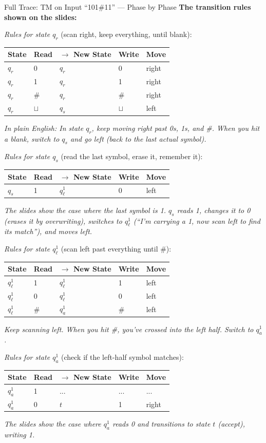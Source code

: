 \documentclass[11pt,a4paper]{article}
\begin{document}
\begin{examplebox}{Full Trace: TM on Input ``101\#11'' --- Phase by Phase}
\textbf{The transition rules shown on the slides:}

\textit{Rules for state $q_r$} (scan right, keep everything, until blank):
\begin{center}
\begin{tabular}{lllll}
\toprule
State & Read & $\to$ New State & Write & Move \\
\midrule
$q_r$ & 0 & $q_r$ & 0 & right \\
$q_r$ & 1 & $q_r$ & 1 & right \\
$q_r$ & \# & $q_r$ & \# & right \\
$q_r$ & $\sqcup$ & $q_s$ & $\sqcup$ & left \\
\bottomrule
\end{tabular}
\end{center}
\textit{In plain English: In state $q_r$, keep moving right past 0s, 1s, and \#. When you hit a blank, switch to $q_s$ and go left (back to the last actual symbol).}

\textit{Rules for state $q_s$} (read the last symbol, erase it, remember it):
\begin{center}
\begin{tabular}{lllll}
\toprule
State & Read & $\to$ New State & Write & Move \\
\midrule
$q_s$ & 1 & $q_\ell^1$ & 0 & left \\
\bottomrule
\end{tabular}
\end{center}
\textit{The slides show the case where the last symbol is 1. $q_s$ reads 1, changes it to 0 (erases it by overwriting), switches to $q_\ell^1$ (``I'm carrying a 1, now scan left to find its match''), and moves left.}

\textit{Rules for state $q_\ell^1$} (scan left past everything until \#):
\begin{center}
\begin{tabular}{lllll}
\toprule
State & Read & $\to$ New State & Write & Move \\
\midrule
$q_\ell^1$ & 1 & $q_\ell^1$ & 1 & left \\
$q_\ell^1$ & 0 & $q_\ell^1$ & 0 & left \\
$q_\ell^1$ & \# & $q_a^1$ & \# & left \\
\bottomrule
\end{tabular}
\end{center}
\textit{Keep scanning left. When you hit \#, you've crossed into the left half. Switch to $q_a^1$.}

\textit{Rules for state $q_a^1$} (check if the left-half symbol matches):
\begin{center}
\begin{tabular}{lllll}
\toprule
State & Read & $\to$ New State & Write & Move \\
\midrule
$q_a^1$ & 1 & ... & ... & ... \\
$q_a^1$ & 0 & $t$ & 1 & right \\
\bottomrule
\end{tabular}
\end{center}
\textit{The slides show the case where $q_a^1$ reads 0 and transitions to state $t$ (accept), writing 1.}


\end{examplebox}
\end{document}
